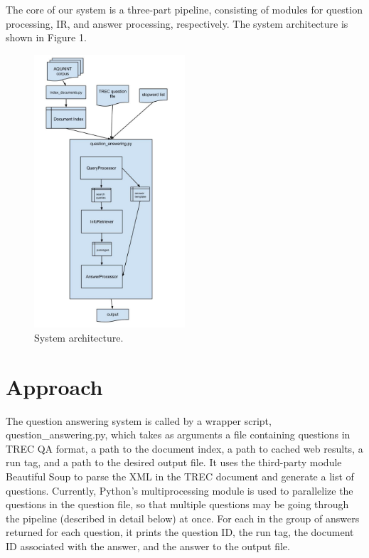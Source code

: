 \documentclass[11pt]{article}
\begin{document}
The core of our system is a three-part pipeline, consisting of modules for question processing, IR, and answer processing, respectively. The system architecture is shown in Figure 1.

\begin{figure}
  \centering
    \includegraphics[width=0.5\textwidth]{system_architecture.jpg}
 \caption{System architecture.}
\end{figure}

\section{Approach}

The question answering system is called by a wrapper script, question\_answering.py, which takes as arguments a file containing questions in TREC QA format, a path to the document index, a path to cached web results, a run tag, and a path to the desired output file. It uses the third-party module Beautiful Soup to parse the XML in the TREC document and generate a list of questions. Currently, Python's multiprocessing module is used to parallelize the questions in the question file, so that multiple questions may be going through the pipeline (described in detail below) at once. For each in the group of answers returned for each question, it prints the question ID, the run tag, the document ID associated with the answer, and the answer to the output file.
\end{document}
